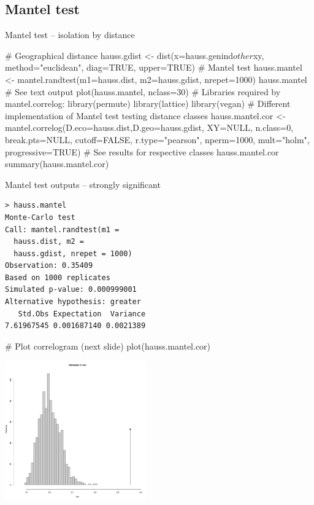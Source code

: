 \documentclass[compress, ucs, xelatex, 11pt, xcolor=svgnames,
  hyperref={
    bookmarks=true,
    unicode=true,
    colorlinks=true,
    pdftitle={Molecular data in R},
    plainpages=false,
    pdfauthor={Vojtech Zeisek},
    pdfsubject={Course about phylogeny and evolution in R},
    pdfcreator={XeLaTeX},
    pdfkeywords={R, evolution, phylogeny, molecular data},
    linkcolor=Tomato,
    anchorcolor=SaddleBrown,
    citecolor=Goldenrod,
    filecolor=DarkMagenta,
    menucolor=Sienna,
    urlcolor=DarkTurquoise,
    pdftex},
  url={hyphens, lowtilde} %
  ]{beamer}
\begin{document}
\subsection{Mantel test}

\begin{frame}[fragile]{Mantel test -- isolation by distance}
  \begin{spluscode}
    # Geographical distance
    hauss.gdist <- dist(x=hauss.genind$other$xy, method="euclidean",
      diag=TRUE, upper=TRUE)
    # Mantel test
    hauss.mantel <- mantel.randtest(m1=hauss.dist, m2=hauss.gdist,
      nrepet=1000)
    hauss.mantel # See text output
    plot(hauss.mantel, nclass=30)
    # Libraries required by mantel.correlog:
    library(permute)
    library(lattice)
    library(vegan)
    # Different implementation of Mantel test testing distance classes
    hauss.mantel.cor <- mantel.correlog(D.eco=hauss.dist,D.geo=hauss.gdist,
      XY=NULL, n.class=0, break.pts=NULL, cutoff=FALSE, r.type="pearson",
      nperm=1000, mult="holm", progressive=TRUE)
    # See results for respective classes
    hauss.mantel.cor
    summary(hauss.mantel.cor)
  \end{spluscode}
\end{frame}

\begin{frame}[fragile]{Mantel test outputs -- strongly significant}
\begin{multicols}{2}
  \begin{verbatim}
> hauss.mantel
Monte-Carlo test
Call: mantel.randtest(m1 =
  hauss.dist, m2 = 
  hauss.gdist, nrepet = 1000)
Observation: 0.35409
Based on 1000 replicates
Simulated p-value: 0.000999001
Alternative hypothesis: greater
   Std.Obs Expectation  Variance
7.61967545 0.001687140 0.0021389
  \end{verbatim}
  \begin{spluscode}
    # Plot correlogram (next slide)
    plot(hauss.mantel.cor)
  \end{spluscode}
  \includegraphics[height=6cm]{mantel.png}
\end{multicols}
\end{frame}
\end{document}
